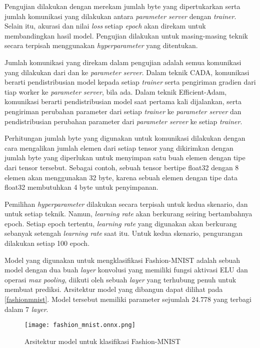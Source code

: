 Pengujian dilakukan dengan merekam jumlah byte yang dipertukarkan serta jumlah komunikasi yang dilakukan antara \emph{parameter server} dengan \emph{trainer}. Selain itu, akurasi dan nilai \emph{loss} setiap \emph{epoch} akan direkam untuk membandingkan hasil model. Pengujian dilakukan untuk masing-masing teknik secara terpisah menggunakan \emph{hyperparameter} yang ditentukan.

Jumlah komunikasi yang direkam dalam pengujian adalah semua komunikasi yang dilakukan dari dan ke \emph{parameter server}. Dalam teknik CADA, komunikasi berarti pendistribusian model kepada setiap \emph{trainer} serta pengiriman gradien dari tiap worker ke \emph{parameter server}, bila ada. Dalam teknik Efficient-Adam, komunikasi berarti pendistribusian model saat pertama kali dijalankan, serta pengiriman perubahan parameter dari setiap \emph{trainer} ke \emph{parameter server} dan pendistribusian perubahan parameter dari \emph{parameter server} ke setiap \emph{trainer}.

Perhitungan jumlah byte yang digunakan untuk komunikasi dilakukan dengan cara mengalikan jumlah elemen dari setiap tensor yang dikirimkan dengan jumlah byte yang diperlukan untuk menyimpan satu buah elemen dengan tipe dari tensor tersebut. Sebagai contoh, sebuah tensor bertipe float32 dengan 8 elemen akan menggunakan 32 byte, karena sebuah elemen dengan tipe data float32 membutuhkan 4 byte untuk penyimpanan.

Pemilihan \emph{hyperparameter} dilakukan secara terpisah untuk kedua skenario, dan untuk setiap teknik. Namun, \emph{learning rate} akan berkurang seiring bertambahnya epoch. Setiap epoch tertentu, \emph{learning rate} yang digunakan akan berkurang sebanyak setengah \emph{learning rate} saat itu. Untuk kedua skenario, pengurangan dilakukan setiap 100 epoch.

Model yang digunakan untuk mengklasifikasi Fashion-MNIST adalah sebuah model dengan dua buah \emph{layer} konvolusi yang memiliki fungsi aktivasi ELU dan operasi \emph{max pooling}, diikuti oleh sebuah \emph{layer} yang terhubung penuh untuk membuat prediksi. Arsitektur model yang dibangun dapat dilihat pada \autoref{fashionmnist}. Model tersebut memiliki parameter sejumlah 24.778 yang terbagi dalam 7 \emph{layer}.

\begin{figure}
  \centering
  \texttt{[image: fashion\_mnist.onnx.png]}
  \caption{Arsitektur model untuk klasifikasi Fashion-MNIST}\label{fashionmnist}
\end{figure}


